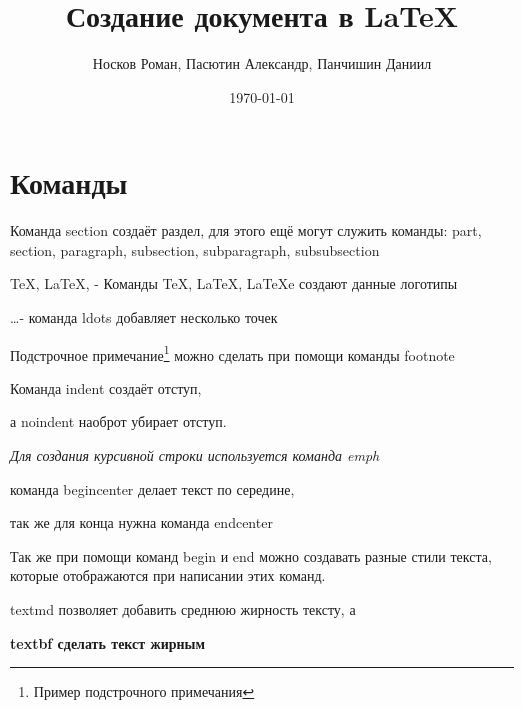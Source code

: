 \documentclass{article}
\author{Носков Роман, Пасютин Александр, Панчишин Даниил}%
\date{\today}%
\title{Создание документа в \LaTeX}%
\begin{document}
\maketitle%
\section{Команды}
Команда section создаёт раздел, для этого ещё могут служить команды: part, section, paragraph, 
subsection, subparagraph, subsubsection


\TeX, \LaTeX, \LaTeXe  - Команды TeX, LaTeX, LaTeXe создают данные логотипы 

\ldots - команда ldots добавляет несколько точек

Подстрочное примечание\footnote{Пример подстрочного примечания} можно сделать при помощи команды footnote


\indent Команда indent создаёт отступ,


\noindent а noindent наоброт убирает отступ.


\emph{Для создания курсивной строки используется команда emph}

\begin{center}
	команда begin{center} делает текст по середине, 
	
	так же для конца нужна команда end{center}
\end{center}

\begin{huge}
	Так же при помощи команд begin и end можно создавать разные стили текста, которые отображаются при написании этих команд.
\end{huge}


\textmd{textmd позволяет добавить среднюю жирность тексту, а}


\textbf{textbf сделать текст жирным}
\end{document}
